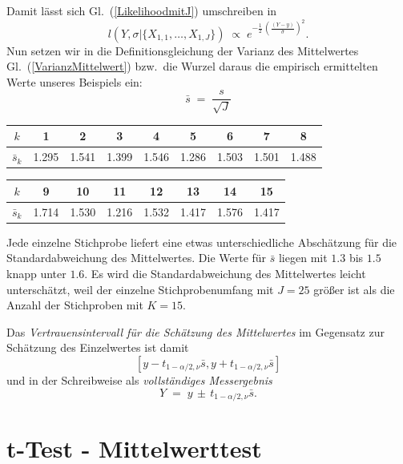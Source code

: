 Damit lässt sich Gl.~(\ref{LikelihoodmitJ}) umschreiben in
\begin{equation}
l(Y, \sigma | \{X_{1,1}, \dots, X_{1,J}\}) \; \propto \;
 e^{- \frac{1}{2} \, \left( \frac{(Y - y)}{\bar \sigma} \right)^2 } .
\end{equation}
Nun setzen wir in die Definitionsgleichung
der Varianz des Mittelwertes Gl.~(\ref{VarianzMittelwert}) bzw.\
die Wurzel daraus die empirisch ermittelten Werte unseres Beispiels ein:
\begin{equation}
\bar s \; = \; \frac{s}{\sqrt{J}}
\label{empirischeVarianzMittelwert}
\end{equation}

\begin{tabular}{c||c|c|c|c|c|c|c|c}
$k$   &  1     &    2   &    3   &   4    &    5   &   6    &   7    &   8   \\
\hline\hline
$\bar s_k$ &  1.295 &  1.541 &  1.399 &  1.546 &  1.286 &  1.503 &  1.501 &  1.488\\
\end{tabular}

\vspace{3mm}

\begin{tabular}{c||c|c|c|c|c|c|c}
$k$   &  9     &    10  &   11   &   12   &   13   &   14   &   15  \\
\hline\hline
$\bar s_k$ &  1.714 &  1.530 &  1.216 &  1.532 &  1.417 &  1.576 &  1.417\\
\end{tabular}

Jede einzelne Stichprobe liefert eine etwas unterschiedliche Abschätzung für die
Standardabweichung des Mittelwertes. Die Werte für $\bar s$ liegen mit $1.3$ bis $1.5$
knapp unter $1.6$. Es wird die Standardabweichung des Mittelwertes leicht unterschätzt, weil
der einzelne Stichprobenumfang mit $J = 25$ größer ist als die Anzahl der Stichproben mit
$K = 15$.

Das \textsl{Vertrauensintervall für die Schätzung des Mittelwertes} im Gegensatz zur
Schätzung des Einzelwertes ist damit
$$
[y - t_{1-\alpha/2,\nu} \bar s, y + t_{1-\alpha/2,\nu} \bar s]
$$
und in der Schreibweise als \textsl{vollständiges Messergebnis}
\begin{equation}
Y \; = \; y \, \pm \, t_{1-\alpha/2,\nu} \bar s .
\label{vollstaendigesErgebMittelwert}
\end{equation}




\section{t-Test - Mittelwerttest}


